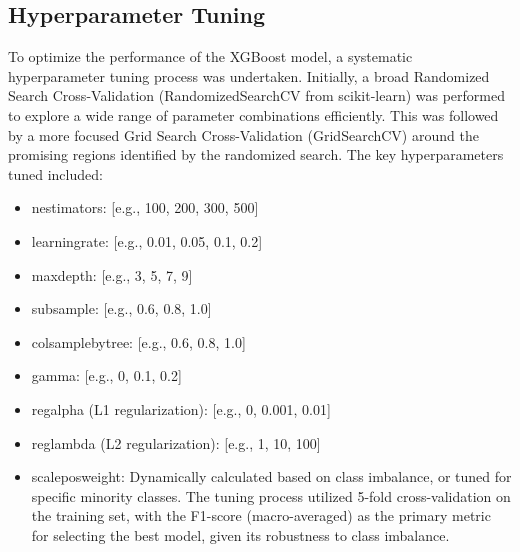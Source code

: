 \subsection{Hyperparameter Tuning}
To optimize the performance of the XGBoost model, a systematic hyperparameter tuning process was undertaken. Initially, a broad Randomized Search Cross-Validation (RandomizedSearchCV from scikit-learn) was performed to explore a wide range of parameter combinations efficiently. This was followed by a more focused Grid Search Cross-Validation (GridSearchCV) around the promising regions identified by the randomized search. The key hyperparameters tuned included:
\begin{itemize}
    \item n\textunderscore estimators: [e.g., 100, 200, 300, 500]
    \item learning\textunderscore rate: [e.g., 0.01, 0.05, 0.1, 0.2]
    \item max\textunderscore depth: [e.g., 3, 5, 7, 9]
    \item subsample: [e.g., 0.6, 0.8, 1.0]
    \item colsample\textunderscore bytree: [e.g., 0.6, 0.8, 1.0]
    \item gamma: [e.g., 0, 0.1, 0.2]
    \item reg\textunderscore alpha (L1 regularization): [e.g., 0, 0.001, 0.01]
    \item  reg\textunderscore lambda (L2 regularization): [e.g., 1, 10, 100]
    \item scale\textunderscore pos\textunderscore weight: Dynamically calculated based on class imbalance, or tuned for specific minority classes. The tuning process utilized 5-fold cross-validation on the training set, with the F1-score (macro-averaged) as the primary metric for selecting the best model, given its robustness to class imbalance.
\end{itemize}

